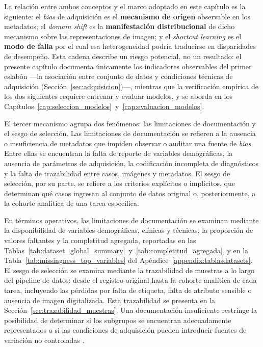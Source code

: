 La relación entre ambos conceptos y el marco adoptado en este capítulo es la siguiente: el \textit{bias} de adquisición es el \textbf{mecanismo de origen} observable en los metadatos; el \textit{domain shift} es la \textbf{manifestación distribucional} de dicho mecanismo sobre las representaciones de imagen; y el \textit{shortcut learning} es el \textbf{modo de falla} por el cual esa heterogeneidad podría traducirse en disparidades de desempeño. Esta cadena describe un riesgo potencial, no un resultado: el presente capítulo documenta únicamente los indicadores observables del primer eslabón —la asociación entre conjunto de datos y condiciones técnicas de adquisición (Sección~\ref{sec:adquisicion})—, mientras que la verificación empírica de los dos siguientes requiere entrenar y evaluar modelos, y se aborda en los Capítulos~\ref{cap:seleccion_modelos}~y~\ref{cap:evaluacion_modelos}.

El tercer mecanismo agrupa dos fenómenos: las limitaciones de documentación y el sesgo de selección. Las limitaciones de documentación se refieren a la ausencia o insuficiencia de metadatos que impiden observar o auditar una fuente de \textit{bias}. Entre ellas se encuentran la falta de reporte de variables demográficas, la ausencia de parámetros de adquisición, la codificación incompleta de diagnósticos y la falta de trazabilidad entre casos, imágenes y metadatos. El sesgo de selección, por su parte, se refiere a los criterios explícitos o implícitos, que determinan qué casos ingresan al conjunto de datos original o, posteriormente, a la cohorte analítica de una tarea específica.

En términos operativos, las limitaciones de documentación se examinan mediante la disponibilidad de variables demográficas, clínicas y técnicas, la proporción de valores faltantes y la completitud agregada, reportadas en las Tablas~\ref{tab:dataset_global_summary}~y~\ref{tab:completitud_agregada}, y en la Tabla~\ref{tab:missingness_top_variables} del Apéndice~\ref{appendix:tablasdatasets}. El sesgo de selección se examina mediante la trazabilidad de muestras a lo largo del pipeline de datos: desde el registro original hasta la cohorte analítica de cada tarea, incluyendo las pérdidas por falta de etiqueta, falta de atributo sensible o ausencia de imagen digitalizada. Esta trazabilidad se presenta en la Sección~\ref{sec:trazabilidad_muestras}. Una documentación insuficiente restringe la posibilidad de determinar si los subgrupos se encuentran adecuadamente representados o si las condiciones de adquisición pueden introducir fuentes de variación no controladas \parencite{galanty2024}.

